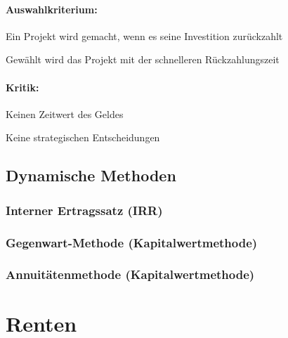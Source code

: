 \paragraph{Auswahlkriterium:}
\begin{compactitem}
	\item Ein Projekt wird gemacht, wenn es seine Investition zurückzahlt
	\item Gewählt wird das Projekt mit der schnelleren Rückzahlungszeit
\end{compactitem}

\paragraph{Kritik:}
\begin{compactitem}
	\item Keinen Zeitwert des Geldes
	\item Keine strategischen Entscheidungen
\end{compactitem}



\clearpage
\subsection{Dynamische Methoden}
\clearpage
\subsubsection{Interner Ertragssatz (IRR)}

\clearpage
\subsubsection{Gegenwart-Methode (Kapitalwertmethode)}

\clearpage
\subsubsection{Annuitätenmethode (Kapitalwertmethode)}

\clearpage
\section{Renten}
